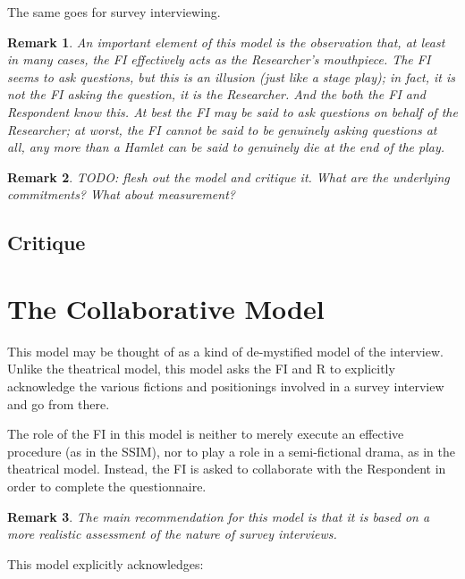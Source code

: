 \documentclass[11pt,twoside]{article}
\newtheorem{remark}{Remark}
\begin{document}
The same goes for survey interviewing.

\begin{remark}
An important element of this model is the observation that, at least
in many cases, the FI effectively acts as the Researcher's mouthpiece.
The FI seems to ask questions, but this is an illusion (just like a
stage play); in fact, it is not the FI asking the question, it is the
Researcher.  And the both the FI and Respondent know this.  At best
the FI may be said to ask questions on behalf of the Researcher; at
worst, the FI cannot be said to be genuinely asking questions at all,
any more than a Hamlet can be said to genuinely die at the end of the
play.
\end{remark}

\begin{remark}
  TODO: flesh out the model and critique it.  What are the underlying
  commitments?  What about measurement?
\end{remark}

\subsection{Critique}

\section{The Collaborative Model}

This model may be thought of as a kind of de-mystified model of the
interview.  Unlike the theatrical model, this model asks the FI and R
to explicitly acknowledge the various fictions and positionings
involved in a survey interview and go from there.

The role of the FI in this model is neither to merely execute an
effective procedure (as in the SSIM), nor to play a role in a
semi-fictional drama, as in the theatrical model.  Instead, the FI is
asked to collaborate with the Respondent in order to complete the
questionnaire.

\begin{remark}
  The main recommendation for this model is that it is based on a more
  realistic assessment of the nature of survey interviews.
\end{remark}

This model explicitly acknowledges:
\end{document}
